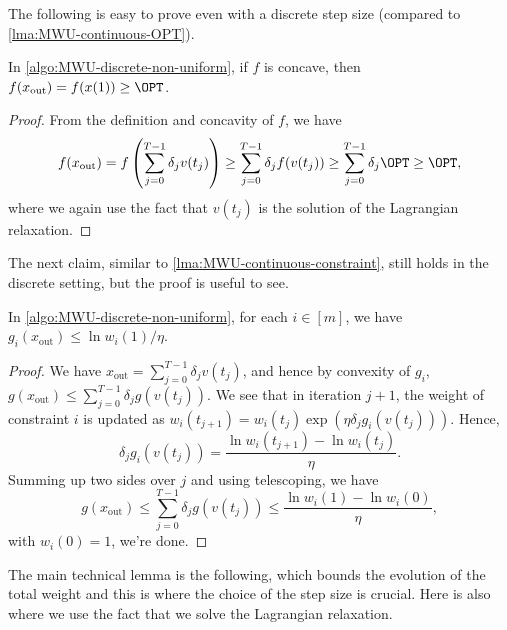 The following is easy to prove even with a discrete step size (compared to \autoref{lma:MWU-continuous-OPT}).

\begin{lemma}\label{lma:MWU-discrete-non-uniform-OPT}
	In \autoref{algo:MWU-discrete-non-uniform}, if \(f\) is concave, then \(f(x _{\text{out} }) = f(x (1)) \geq \OPT\).
\end{lemma}
\begin{proof}
	From the definition and concavity of \(f\), we have
	\[
		f(x _{\text{out} })
		= f \left( \sum_{j=0}^{T-1} \delta _{j} v (t_j) \right)
		\geq \sum_{j=0}^{T-1} \delta _j f(v (t_j))
		\geq \sum_{j=0}^{T-1} \delta _j \OPT
		\geq \OPT,
	\]
	where we again use the fact that \(v(t_j)\) is the solution of the Lagrangian relaxation.
\end{proof}

The next claim, similar to \autoref{lma:MWU-continuous-constraint}, still holds in the discrete setting, but the proof is useful to see.

\begin{lemma}\label{lma:MWU-discrete-non-uniform-constraint}
	In \autoref{algo:MWU-discrete-non-uniform}, for each \(i \in [m]\), we have \(g_i(x _{\text{out} }) \leq \ln w_i(1) / \eta \).
\end{lemma}
\begin{proof}
	We have \(x_{\text{out} } = \sum_{j=0}^{T-1} \delta _j v(t_j)\), and hence by convexity of \(g_i\), \(g(x_{\text{out} }) \leq \sum_{j=0}^{T-1} \delta _j g(v(t_j))\). We see that in iteration \(j+1\), the weight of constraint \(i\) is updated as \(w_i(t_{j+1}) = w_i(t_j) \exp (\eta \delta _j g_i(v(t_j)))\). Hence,
	\[
		\delta _j g_i(v(t_j))
		= \frac{\ln w_i(t_{j+1}) - \ln w_i(t_j)}{\eta }.
	\]
	Summing up two sides over \(j\) and using telescoping, we have
	\[
		g(x_{\text{out} })
		\leq \sum_{j=0}^{T-1} \delta _j g(v(t_j))
		\leq \frac{\ln w_i(1) - \ln w_i(0)}{\eta },
	\]
	with \(w_i(0) = 1\), we're done.
\end{proof}

The main technical lemma is the following, which bounds the evolution of the total weight and this is where the choice of the step size is crucial. Here is also where we use the fact that we solve the Lagrangian relaxation.


